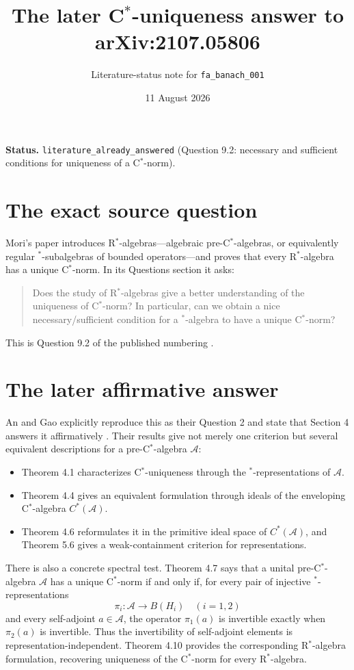 \documentclass[11pt]{article}
\title{The later C$^*$-uniqueness answer to arXiv:2107.05806}
\author{Literature-status note for \texttt{fa\_banach\_001}}
\date{11 August 2026}
\begin{document}
\maketitle

\noindent\textbf{Status.}
\texttt{literature\_already\_answered} (Question 9.2: necessary and
sufficient conditions for uniqueness of a C$^*$-norm).

\section*{The exact source question}

Mori's paper introduces R$^*$-algebras---algebraic pre-C$^*$-algebras, or
equivalently regular $^*$-subalgebras of bounded operators---and proves that
every R$^*$-algebra has a unique C$^*$-norm.  In its Questions section it asks:
\begin{quote}
Does the study of R$^*$-algebras give a better understanding of the
uniqueness of C$^*$-norm?  In particular, can we obtain a nice
necessary/sufficient condition for a $^*$-algebra to have a unique C$^*$-norm?
\end{quote}
This is Question 9.2 of the published numbering \cite{Mori}.

\section*{The later affirmative answer}

An and Gao explicitly reproduce this as their Question 2 and state that
Section 4 answers it affirmatively \cite{AG}.  Their results give not merely
one criterion but several equivalent descriptions for a pre-C$^*$-algebra
$\mathcal A$:
\begin{itemize}
  \item Theorem 4.1 characterizes C$^*$-uniqueness through the
  $^*$-representations of $\mathcal A$.
  \item Theorem 4.4 gives an equivalent formulation through ideals of the
  enveloping C$^*$-algebra $C^*(\mathcal A)$.
  \item Theorem 4.6 reformulates it in the primitive ideal space of
  $C^*(\mathcal A)$, and Theorem 5.6 gives a weak-containment criterion for
  representations.
\end{itemize}
There is also a concrete spectral test.  Theorem 4.7 says that a unital
pre-C$^*$-algebra $\mathcal A$ has a unique C$^*$-norm if and only if, for
every pair of injective $^*$-representations
\[
 \pi_i:\mathcal A\longrightarrow B(H_i)\quad(i=1,2)
\]
and every self-adjoint $a\in\mathcal A$, the operator $\pi_1(a)$ is
invertible exactly when $\pi_2(a)$ is invertible.  Thus the invertibility of
self-adjoint elements is representation-independent.  Theorem 4.10 provides
the corresponding R$^*$-algebra formulation, recovering uniqueness of the
C$^*$-norm for every R$^*$-algebra.
\end{document}
